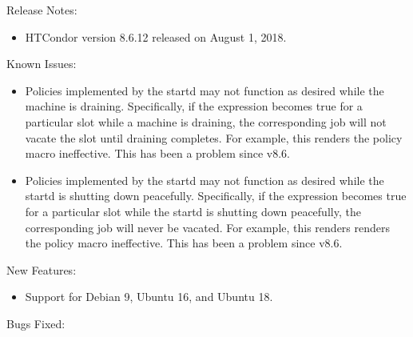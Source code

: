 \noindent Release Notes:

\begin{itemize}

\item HTCondor version 8.6.12 released on August 1, 2018.

\end{itemize}

\noindent Known Issues:

\begin{itemize}

\item Policies implemented by the startd may not function as desired while
the machine is draining.  Specifically, if the  expression
becomes true for a particular slot while a machine is draining, the
corresponding job will not vacate the slot until draining completes.  For
example, this renders the policy macro 
ineffective.  This has been a problem since v8.6.

\item Policies implemented by the startd may not function as desired while
the startd is shutting down peacefully.  Specifically, if the 
expression becomes true for a particular slot while the startd is shutting
down peacefully, the corresponding job will never be vacated.  For example,
this renders renders the policy macro 
ineffective.  This has been a problem since v8.6.

\end{itemize}

\noindent New Features:

\begin{itemize}

\item Support for Debian 9, Ubuntu 16, and Ubuntu 18.

\end{itemize}

\noindent Bugs Fixed:

